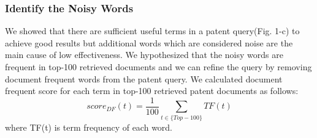 \documentclass{sig-alternate}
\begin{document}
\subsubsection{Identify the Noisy Words}
We showed that there are sufficient useful terms in a patent query(Fig. 1-c) to achieve good results but additional words which are considered noise are the main cause of low effectiveness. We hypothesized that the noisy words are frequent in top-100 retrieved documents and we can refine the query by removing document frequent words from the patent query. We calculated document frequent score for each term in top-100 retrieved patent documents as follows:
\begin{equation}
score_{DF}(t)= \frac{1}{100}\sum_{t\in \lbrace Top-100\rbrace} TF(t)  
 \label{eq:dfscore}
\end{equation}
where TF(t) is term frequency of each word. 
\end{document}
